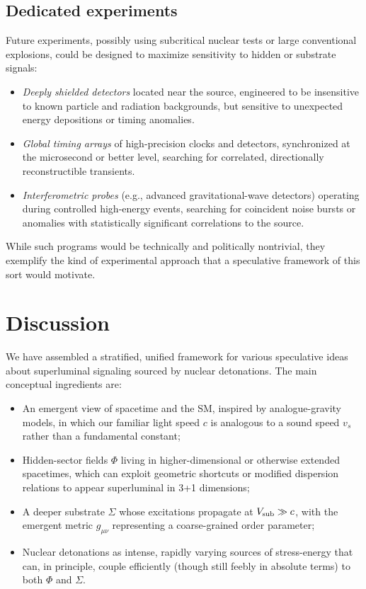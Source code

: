 \documentclass[aps,prd,twocolumn,nofootinbib,superscriptaddress]{revtex4-2}
\begin{document}
\subsection{Dedicated experiments}

Future experiments, possibly using subcritical nuclear tests or large conventional explosions, could be designed to maximize sensitivity to hidden or substrate signals:
\begin{itemize}
    \item \textit{Deeply shielded detectors} located near the source, engineered to be insensitive to known particle and radiation backgrounds, but sensitive to unexpected energy depositions or timing anomalies.
    \item \textit{Global timing arrays} of high-precision clocks and detectors, synchronized at the microsecond or better level, searching for correlated, directionally reconstructible transients.
    \item \textit{Interferometric probes} (e.g., advanced gravitational-wave detectors) operating during controlled high-energy events, searching for coincident noise bursts or anomalies with statistically significant correlations to the source.
\end{itemize}
While such programs would be technically and politically nontrivial, they exemplify the kind of experimental approach that a speculative framework of this sort would motivate.

\section{Discussion}
\label{sec:discussion}

We have assembled a stratified, unified framework for various speculative ideas about superluminal signaling sourced by nuclear detonations. The main conceptual ingredients are:
\begin{itemize}
    \item An emergent view of spacetime and the SM, inspired by analogue-gravity models, in which our familiar light speed $c$ is analogous to a sound speed $v_s$ rather than a fundamental constant;
    \item Hidden-sector fields $\Phi$ living in higher-dimensional or otherwise extended spacetimes, which can exploit geometric shortcuts or modified dispersion relations to appear superluminal in 3+1 dimensions;
    \item A deeper substrate $\Sigma$ whose excitations propagate at $V_{\rm sub} \gg c$, with the emergent metric $g_{\mu\nu}$ representing a coarse-grained order parameter;
    \item Nuclear detonations as intense, rapidly varying sources of stress-energy that can, in principle, couple efficiently (though still feebly in absolute terms) to both $\Phi$ and $\Sigma$.
\end{itemize}
\end{document}

